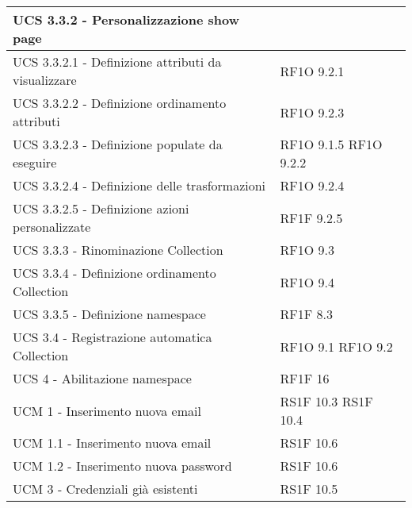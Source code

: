 \begin{center}
\begin{longtable}{ | p{5cm} | p{5cm} |}
            UCS 3.3.2 - Personalizzazione show page &  \\ \hline      
            UCS 3.3.2.1 -  Definizione attributi da visualizzare &  RF1O 9.2.1 \newline  \\ \hline      
            UCS 3.3.2.2 - Definizione ordinamento attributi &  RF1O 9.2.3 \newline  \\ \hline      
            UCS 3.3.2.3 - Definizione populate da eseguire &  RF1O 9.1.5 \newline  RF1O 9.2.2 \newline  \\ \hline      
            UCS 3.3.2.4 - Definizione delle trasformazioni &  RF1O 9.2.4 \newline  \\ \hline      
            UCS 3.3.2.5 - Definizione azioni personalizzate &  RF1F 9.2.5 \newline  \\ \hline      
            UCS 3.3.3  - Rinominazione Collection &  RF1O 9.3 \newline  \\ \hline      
            UCS 3.3.4  - Definizione ordinamento Collection &  RF1O 9.4 \newline  \\ \hline      
            UCS 3.3.5 - Definizione namespace &  RF1F 8.3 \newline  \\ \hline      
            UCS 3.4  - Registrazione automatica Collection &  RF1O 9.1 \newline  RF1O 9.2 \newline  \\ \hline      
            UCS 4 - Abilitazione namespace &  RF1F 16 \newline  \\ \hline      
            UCM 1 -  Inserimento nuova email &  RS1F 10.3 \newline  RS1F 10.4 \newline  \\ \hline      
            UCM 1.1 -  Inserimento nuova email &  RS1F 10.6 \newline  \\ \hline      
            UCM 1.2 - Inserimento nuova password &  RS1F 10.6 \newline  \\ \hline      
            UCM 3 - Credenziali già esistenti &  RS1F 10.5 \newline  \\ \hline      

\end{longtable}
\end{center}
